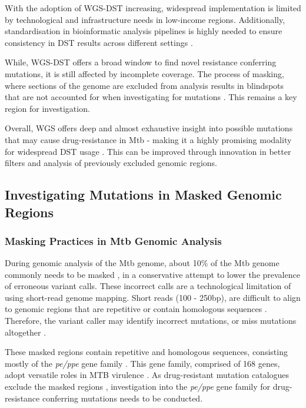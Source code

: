 With the adoption of WGS-DST increasing, widespread implementation is limited by technological and infrastructure needs in low-income regions. Additionally, standardisation in bioinformatic analysis pipelines is highly needed to ensure consistency in DST results across different settings \cite{meehan2018, world2018use, inzaule2021genomic}. 

While, WGS-DST offers a broad window to find novel resistance conferring mutations, it is still affected by incomplete coverage. The process of masking, where sections of the genome are excluded from analysis results in blindspots that are not accounted for when investigating for mutations \cite{modlin2021exact}. This remains a key region for investigation. 

Overall, WGS offers deep and almost exhaustive insight into possible mutations that may cause drug-resistance in Mtb - making it a highly promising modality for widespread DST usage \cite{whitney2016}. This can be improved through innovation in better filters and analysis of previously excluded genomic regions. 
 \subsection{Investigating Mutations in Masked Genomic Regions}
 
\subsubsection{Masking Practices in Mtb Genomic Analysis}

During genomic analysis of the Mtb genome, about 10\% of the Mtb genome commonly needs to be masked \cite{meehan2018}, in a conservative attempt to lower the prevalence of erroneous variant calls. These incorrect calls are a technological limitation of using short-read genome mapping. Short reads (100 - 250bp), are difficult to align to genomic regions that are repetitive or contain homologous sequences \cite{li2008mapping, li2014toward}.  Therefore, the variant caller may identify incorrect mutations, or miss mutations altogether \cite{marin2022benchmarking}. 

These masked regions contain repetitive and homologous sequences, consisting mostly of the \textit{pe/ppe} gene family \cite{marin2022benchmarking}. This gene family, comprised of 168 genes, adopt versatile roles in MTB virulence \cite{gagneux2018,d2023pe}.  As drug-resistant mutation catalogues exclude the masked regions \cite{Walker2022}, investigation into the \textit{pe/ppe} gene family for drug-resistance conferring mutations needs to be conducted. 

